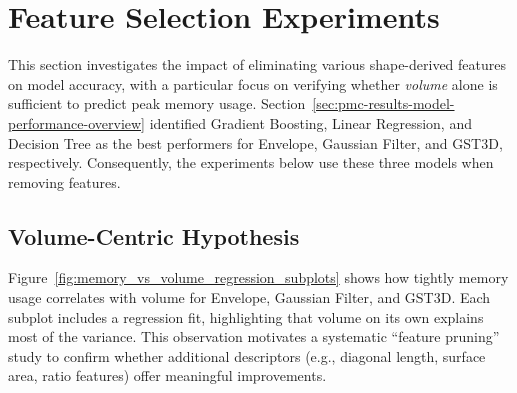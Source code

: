 \section{Feature Selection Experiments}
\label{sec:pmc-results-feature-selection-experiments}

This section investigates the impact of eliminating various shape-derived features on model accuracy, with a particular focus on verifying whether \emph{volume} alone is sufficient to predict peak memory usage.
Section~\ref{sec:pmc-results-model-performance-overview} identified Gradient Boosting, Linear Regression, and Decision Tree as the best performers for Envelope, Gaussian Filter, and \ac{GST3D}, respectively.
Consequently, the experiments below use these three models when removing features.

\subsection{Volume-Centric Hypothesis}
\label{subsec:feature-selection-volume-centric-hypothesis}

Figure~\ref{fig:memory_vs_volume_regression_subplots} shows how tightly memory usage correlates with volume for Envelope, Gaussian Filter, and \ac{GST3D}.
Each subplot includes a regression fit, highlighting that volume on its own explains most of the variance.
This observation motivates a systematic “feature pruning” study to confirm whether additional descriptors (e.g., diagonal length, surface area, ratio features) offer meaningful improvements.

